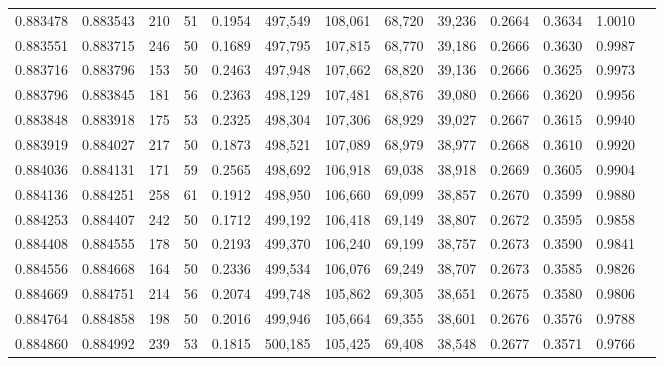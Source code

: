 \begin{tabular}{rrrrrrrrrrrrr}
0.883478 & 0.883543 &   210 &  51 &                                     0.1954 & 497,549 & 108,061 &  68,720 &  39,236 & 0.2664 & 0.3634 & 1.0010 \\
0.883551 & 0.883715 &   246 &  50 &                                     0.1689 & 497,795 & 107,815 &  68,770 &  39,186 & 0.2666 & 0.3630 & 0.9987 \\
0.883716 & 0.883796 &   153 &  50 &                                     0.2463 & 497,948 & 107,662 &  68,820 &  39,136 & 0.2666 & 0.3625 & 0.9973 \\
0.883796 & 0.883845 &   181 &  56 &                                     0.2363 & 498,129 & 107,481 &  68,876 &  39,080 & 0.2666 & 0.3620 & 0.9956 \\
0.883848 & 0.883918 &   175 &  53 &                                     0.2325 & 498,304 & 107,306 &  68,929 &  39,027 & 0.2667 & 0.3615 & 0.9940 \\
0.883919 & 0.884027 &   217 &  50 &                                     0.1873 & 498,521 & 107,089 &  68,979 &  38,977 & 0.2668 & 0.3610 & 0.9920 \\
0.884036 & 0.884131 &   171 &  59 &                                     0.2565 & 498,692 & 106,918 &  69,038 &  38,918 & 0.2669 & 0.3605 & 0.9904 \\
0.884136 & 0.884251 &   258 &  61 &                                     0.1912 & 498,950 & 106,660 &  69,099 &  38,857 & 0.2670 & 0.3599 & 0.9880 \\
0.884253 & 0.884407 &   242 &  50 &                                     0.1712 & 499,192 & 106,418 &  69,149 &  38,807 & 0.2672 & 0.3595 & 0.9858 \\
0.884408 & 0.884555 &   178 &  50 &                                     0.2193 & 499,370 & 106,240 &  69,199 &  38,757 & 0.2673 & 0.3590 & 0.9841 \\
0.884556 & 0.884668 &   164 &  50 &                                     0.2336 & 499,534 & 106,076 &  69,249 &  38,707 & 0.2673 & 0.3585 & 0.9826 \\
0.884669 & 0.884751 &   214 &  56 &                                     0.2074 & 499,748 & 105,862 &  69,305 &  38,651 & 0.2675 & 0.3580 & 0.9806 \\
0.884764 & 0.884858 &   198 &  50 &                                     0.2016 & 499,946 & 105,664 &  69,355 &  38,601 & 0.2676 & 0.3576 & 0.9788 \\
0.884860 & 0.884992 &   239 &  53 &                                     0.1815 & 500,185 & 105,425 &  69,408 &  38,548 & 0.2677 & 0.3571 & 0.9766 \\

\end{tabular}

